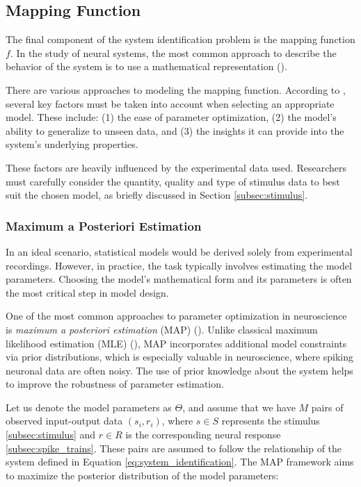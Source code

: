\subsection{Mapping Function}
\label{subsec:mapping_function}

The final component of the system identification problem is the mapping function $f$. In the study of neural systems, the most common approach to describe the behavior of the system is to use a mathematical representation (\citet{annurev:/content/journals/10.1146/annurev-vision-091718-014731}).

There are various approaches to modeling the mapping function. According to \citet{annurev:/content/journals/10.1146/annurev-vision-091718-014731}, several key factors must be taken into account when selecting an appropriate model. These include: (1) the ease of parameter optimization, (2) the model's ability to generalize to unseen data, and (3) the insights it can provide into the system's underlying properties.

These factors are heavily influenced by the experimental data used. Researchers must carefully consider the quantity, quality and type of stimulus data to best suit the chosen model, as briefly discussed in Section \ref{subsec:stimulus}.

\subsubsection{Maximum a Posteriori Estimation}
\label{subsubsec:map_estimation}

In an ideal scenario, statistical models would be derived solely from experimental recordings. However, in practice, the task typically involves estimating the model parameters. Choosing the model's mathematical form and its parameters is often the most critical step in model design.

One of the most common approaches to parameter optimization in neuroscience is \emph{maximum a posteriori estimation} (MAP) (\citet{wu2006complete, annurev:/content/journals/10.1146/annurev-vision-091718-014731}). Unlike classical maximum likelihood estimation (MLE) (\citet{alpaydin2020introduction}), MAP incorporates additional model constraints via prior distributions, which is especially valuable in neuroscience, where spiking neuronal data are often noisy. The use of prior knowledge about the system helps to improve the robustness of parameter estimation.

Let us denote the model parameters as $\Theta$, and assume that we have $M$ pairs of observed input-output data $(s_i, r_i)$, where $s \in S$ represents the stimulus \ref{subsec:stimulus} and $r \in R$ is the corresponding neural response \ref{subsec:spike_trains}. These pairs are assumed to follow the relationship of the system defined in Equation \ref{eq:system_identification}. The MAP framework aims to maximize the posterior distribution of the model parameters:

